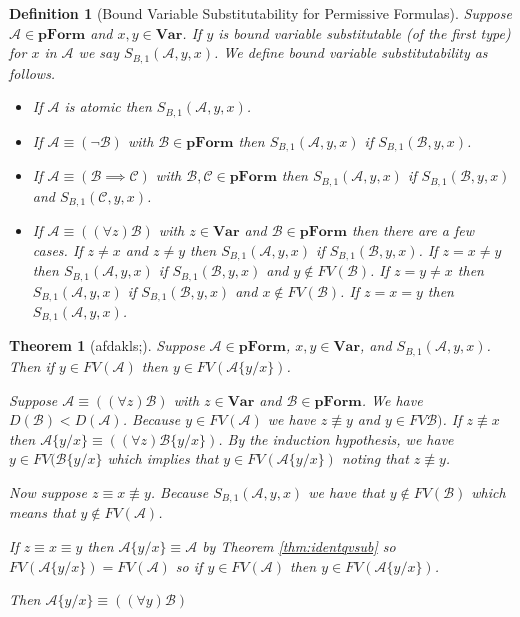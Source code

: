 \documentclass[12pt]{article}
\theoremstyle{break}
\newtheorem{definition}{Definition}[section]
\theoremstyle{break}
\newtheorem{theorem}{Theorem}[section]
\theoremstyle{break}
\theoremstyle{break}
\theoremstyle{break}
\newtheorem{informal definition}[definition]{Informal Definition}
\newcommand{\mc}[1]{\mathcal{#1}}
\begin{document}
\begin{definition}[Bound Variable Substitutability for Permissive Formulas]
Suppose $\mc{A}\in\textbf{pForm}$ and $x, y \in \textbf{Var}$.
If $y$ is bound variable substitutable (of the first type) for $x$ in $\mc{A}$ we say $S_{B,1}(\mc{A}, y, x)$.
We define bound variable substitutability as follows.

\begin{itemize}
\item{If $\mc{A}$ is atomic then $S_{B,1}(\mc{A}, y, x)$.}
\item{If $\mc{A} \equiv (\lnot \mc{B})$ with $\mc{B}\in\textbf{pForm}$ then $S_{B, 1}(\mc{A}, y, x)$ if $S_{B, 1}(\mc{B}, y, x)$.}
\item{If $\mc{A} \equiv (\mc{B}\implies \mc{C})$ with $\mc{B}, \mc{C}\in\textbf{pForm}$ then $S_{B,1}(\mc{A}, y, x)$ if $S_{B,1}(\mc{B}, y, x)$ and $S_{B, 1}(\mc{C}, y, x)$.}
\item{If $\mc{A} \equiv ((\forall z) \mc{B})$ with $z\in\textbf{Var}$ and $\mc{B}\in \textbf{pForm}$ then there are a few cases. If $z\not= x$ and $z\not = y$ then $S_{B,1}(\mc{A}, y, x)$ if $S_{B,1}(\mc{B}, y, x)$. If $z = x\not =y$ then $S_{B, 1}(\mc{A}, y, x)$ if $S_{B,1}(\mc{B}, y, x)$ and $y\not \in FV(\mc{B})$. If $z=y\not=x$ then $S_{B,1}(\mc{A}, y, x)$ if $S_{B,1}(\mc{B}, y, x)$ and $x\not \in FV(\mc{B})$. If $z=x=y$ then $S_{B,1}(\mc{A}, y, x)$.}
\end{itemize}
\end{definition}

\begin{theorem}[afdakls;]
Suppose $\mc{A}\in\textbf{pForm}$, $x, y \in \textbf{Var}$, and $S_{B,1}(\mc{A}, y, x)$.
Then if $y\in FV(\mc{A})$ then $y\in FV(\mc{A}\{y/x\})$.

Suppose $\mc{A} \equiv ((\forall z) \mc{B})$ with $z\in\textbf{Var}$ and $\mc{B}\in\textbf{pForm}$.
We have $D(\mc{B}) < D(\mc{A})$.
Because $y\in FV(\mc{A})$ we have $z\not \equiv y$ and $y\in FV\mc{B})$.
If $z\not \equiv x$ then $\mc{A}\{y/x\} \equiv ((\forall z) \mc{B}\{y/x\})$.
By the induction hypothesis, we have $y \in FV(\mc{B}\{y/x\}$ which implies that $y\in FV(\mc{A}\{y/x\})$ noting that $z\not \equiv y$.

Now suppose $z\equiv x \not \equiv y$.
Because $S_{B,1}(\mc{A}, y, x)$ we have that $y\not \in FV(\mc{B})$ which means that $y\not \in FV(\mc{A})$.

If $z\equiv x \equiv y$ then $\mc{A}\{y/x\} \equiv \mc{A}$ by Theorem \ref{thm:identqvsub} so $FV(\mc{A}\{y/x\}) = FV(\mc{A})$ so if $y\in FV(\mc{A})$ then $y\in FV(\mc{A}\{y/x\})$.

Then $\mc{A}\{y/x\} \equiv ((\forall y) \mc{B})$
\end{theorem}
\end{document}
